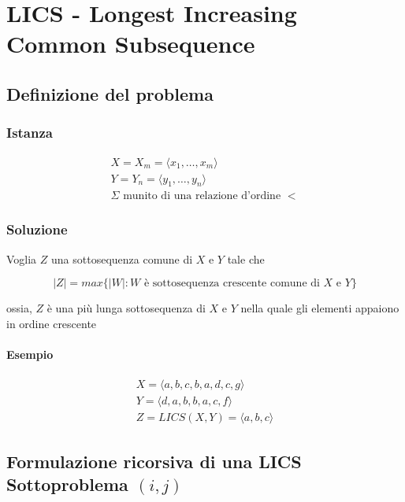 \chapter{LICS - Longest Increasing Common Subsequence}

\section{Definizione del problema}

\subsection{Istanza}
{
    \large

    \begin{gather*}
        X = X_m = \langle x_1, \dots, x_m \rangle \\ 
        Y = Y_n = \langle y_1, \dots, y_n \rangle \\
        \Sigma \text{ munito di una relazione d'ordine } <  
    \end{gather*}
}

\subsection{Soluzione}
Voglia $Z$ una sottosequenza comune di $X$ e $Y$ tale che

{
    \large

    $$
    |Z| = max\{|W|: \text{$W$ è sottosequenza crescente comune di $X$ e $Y$}\}
    $$
}

ossia, $Z$ è una più lunga sottosequenza di $X$ e $Y$ nella quale gli elementi appaiono in ordine crescente

\subsubsection{Esempio}
{
    \large

    \begin{gather*}
        X = \langle a,b,c,b,a,d,c,g \rangle \\
        Y = \langle d,a,b,b,a,c,f \rangle \\
        Z = LICS(X,Y) = \langle a,b,c \rangle
    \end{gather*}
}

\newpage
\section{Formulazione ricorsiva di una LICS Sottoproblema $(i,j)$}

